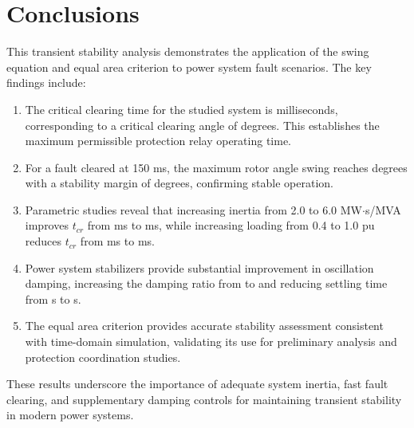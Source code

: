\documentclass[11pt,a4paper]{article}
\begin{document}
\section{Conclusions}

This transient stability analysis demonstrates the application of the swing equation and equal area criterion to power system fault scenarios. The key findings include:

\begin{enumerate}
\item The critical clearing time for the studied system is  milliseconds, corresponding to a critical clearing angle of  degrees. This establishes the maximum permissible protection relay operating time.

\item For a fault cleared at 150 ms, the maximum rotor angle swing reaches  degrees with a stability margin of  degrees, confirming stable operation.

\item Parametric studies reveal that increasing inertia from 2.0 to 6.0 MW$\cdot$s/MVA improves $t_{cr}$ from  ms to  ms, while increasing loading from 0.4 to 1.0 pu reduces $t_{cr}$ from  ms to  ms.

\item Power system stabilizers provide substantial improvement in oscillation damping, increasing the damping ratio from  to  and reducing settling time from  s to  s.

\item The equal area criterion provides accurate stability assessment consistent with time-domain simulation, validating its use for preliminary analysis and protection coordination studies.
\end{enumerate}

These results underscore the importance of adequate system inertia, fast fault clearing, and supplementary damping controls for maintaining transient stability in modern power systems.
\end{document}
